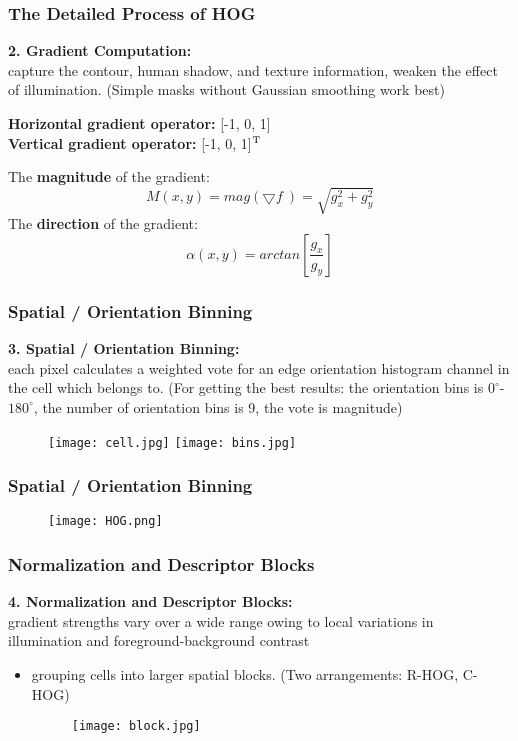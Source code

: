 \documentclass[notheorems,serif,table,compress]{beamer}  %
\begin{document}
\begin{frame}
\frametitle{The Detailed Process of HOG}
\textbf{\color{blue}2. Gradient Computation: }\\
capture the contour, human shadow, and texture information, weaken the effect of illumination. (Simple masks without Gaussian smoothing work best)\\
\begin{center}
{\textbf{Horizontal gradient operator: }} [-1, 0, 1] \\
{\textbf{Vertical gradient operator: }} [-1, 0, 1]$^{\rm T}$ 
\end{center}
The {\textbf{magnitude}} of the gradient:
    \begin{displaymath}
        M(x,y)=mag(\bigtriangledown f ~) = \sqrt{g_{x}^{2}+g_{y}^{2}}
    \end{displaymath}
The {\textbf{direction}} of the gradient:
    \begin{displaymath}
        \alpha (x,y)=arctan \left[ \frac{g_{x}}{g_{y}} \right]
    \end{displaymath}

\end{frame}


\begin{frame}        
\frametitle{Spatial / Orientation Binning}
\textbf{\color{blue}3. Spatial / Orientation Binning: }\\
each pixel calculates a weighted vote for an edge orientation histogram channel in the cell which belongs to. (For getting the best results: the orientation bins is $0^{\circ}$-$180^{\circ}$, the number of orientation bins is 9, the vote is magnitude)
\begin{figure}
    \texttt{[image: cell.jpg]}
    \texttt{[image: bins.jpg]}  
\end{figure}   
\end{frame}
\begin{frame}        
\frametitle{Spatial / Orientation Binning}
\begin{figure}
    \texttt{[image: HOG.png]} 
\end{figure}   
\end{frame}

\begin{frame}        
\frametitle{Normalization and Descriptor Blocks}
\textbf{\color{blue}4. Normalization and Descriptor Blocks: }\\
gradient strengths vary over a wide range owing to local variations in illumination and foreground-background contrast
\begin{itemize}
        \item grouping cells into larger spatial blocks. (Two arrangements: R-HOG, C-HOG)
\begin{figure}
    \texttt{[image: block.jpg]}
\end{figure}   
\end{itemize}
\end{frame}
\end{document}
